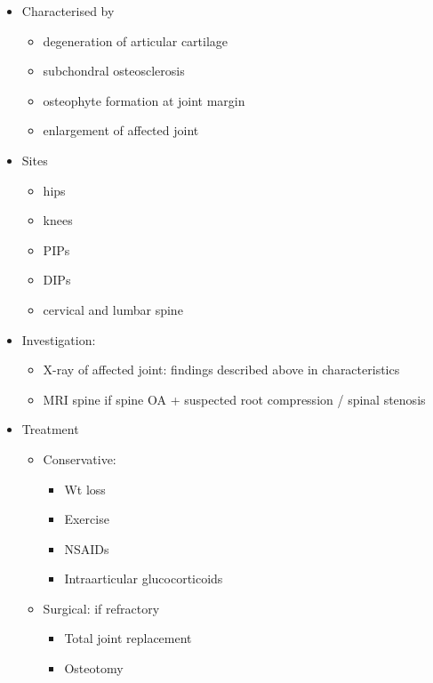 \documentclass[
  12pt,
]{memoir}
\providecommand{\tightlist}{%
  \setlength{\itemsep}{0pt}\setlength{\parskip}{0pt}}
\begin{document}
\begin{itemize}
\tightlist
\item
  Characterised by

  \begin{itemize}
  \tightlist
  \item
    degeneration of articular cartilage
  \item
    subchondral osteosclerosis
  \item
    osteophyte formation at joint margin
  \item
    enlargement of affected joint
  \end{itemize}
\item
  Sites

  \begin{itemize}
  \tightlist
  \item
    hips
  \item
    knees
  \item
    PIPs
  \item
    DIPs
  \item
    cervical and lumbar spine
  \end{itemize}
\item
  Investigation:

  \begin{itemize}
  \tightlist
  \item
    X-ray of affected joint: findings described above in characteristics
  \item
    MRI spine if spine OA + suspected root compression / spinal stenosis
  \end{itemize}
\item
  Treatment

  \begin{itemize}
  \tightlist
  \item
    Conservative:

    \begin{itemize}
    \tightlist
    \item
      Wt loss
    \item
      Exercise
    \item
      NSAIDs
    \item
      Intraarticular glucocorticoids
    \end{itemize}
  \item
    Surgical: if refractory

    \begin{itemize}
    \tightlist
    \item
      Total joint replacement
    \item
      Osteotomy
    \end{itemize}
  \end{itemize}
\end{itemize}
\end{document}
